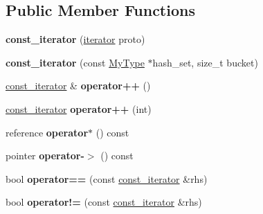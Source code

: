 \subsection*{Public Member Functions}
\begin{DoxyCompactItemize}
\item 
\hypertarget{classemlib_1_1_hash_set_1_1const__iterator_a689aa7869905ced72b4fb8ce9317aedc}{{\bfseries const\+\_\+iterator} (\hyperlink{classemlib_1_1_hash_set_1_1iterator}{iterator} proto)}\label{classemlib_1_1_hash_set_1_1const__iterator_a689aa7869905ced72b4fb8ce9317aedc}

\item 
\hypertarget{classemlib_1_1_hash_set_1_1const__iterator_a144e3b6b7101e8b64362faff15c3c571}{{\bfseries const\+\_\+iterator} (const \hyperlink{classemlib_1_1_hash_set}{My\+Type} $\ast$hash\+\_\+set, size\+\_\+t bucket)}\label{classemlib_1_1_hash_set_1_1const__iterator_a144e3b6b7101e8b64362faff15c3c571}

\item 
\hypertarget{classemlib_1_1_hash_set_1_1const__iterator_ac09a6eddd4cc1c36fa3e75b6747827f8}{\hyperlink{classemlib_1_1_hash_set_1_1const__iterator}{const\+\_\+iterator} \& {\bfseries operator++} ()}\label{classemlib_1_1_hash_set_1_1const__iterator_ac09a6eddd4cc1c36fa3e75b6747827f8}

\item 
\hypertarget{classemlib_1_1_hash_set_1_1const__iterator_abadbe9b7eeadbd90268610075055d9d9}{\hyperlink{classemlib_1_1_hash_set_1_1const__iterator}{const\+\_\+iterator} {\bfseries operator++} (int)}\label{classemlib_1_1_hash_set_1_1const__iterator_abadbe9b7eeadbd90268610075055d9d9}

\item 
\hypertarget{classemlib_1_1_hash_set_1_1const__iterator_aa406989545fa6bdc8f27de3672a7412a}{reference {\bfseries operator$\ast$} () const }\label{classemlib_1_1_hash_set_1_1const__iterator_aa406989545fa6bdc8f27de3672a7412a}

\item 
\hypertarget{classemlib_1_1_hash_set_1_1const__iterator_a860733dfaf85d8945de67c2e80d72838}{pointer {\bfseries operator-\/$>$} () const }\label{classemlib_1_1_hash_set_1_1const__iterator_a860733dfaf85d8945de67c2e80d72838}

\item 
\hypertarget{classemlib_1_1_hash_set_1_1const__iterator_a38e2ff3f2342ab45c8794c6934f6297a}{bool {\bfseries operator==} (const \hyperlink{classemlib_1_1_hash_set_1_1const__iterator}{const\+\_\+iterator} \&rhs)}\label{classemlib_1_1_hash_set_1_1const__iterator_a38e2ff3f2342ab45c8794c6934f6297a}

\item 
\hypertarget{classemlib_1_1_hash_set_1_1const__iterator_a4fb89cf06ac54a4e9cdc416d26d1649c}{bool {\bfseries operator!=} (const \hyperlink{classemlib_1_1_hash_set_1_1const__iterator}{const\+\_\+iterator} \&rhs)}\label{classemlib_1_1_hash_set_1_1const__iterator_a4fb89cf06ac54a4e9cdc416d26d1649c}

\end{DoxyCompactItemize}
